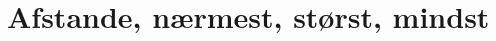 \documentclass[a4paper, 12pt]{article}
\theoremstyle{remark}
\begin{document}
\section*{Afstande, nærmest, størst, mindst}
\end{document}

